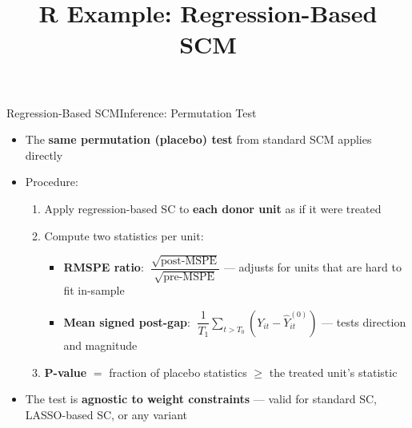 \documentclass[hyperref={pdfpagelabels=false}]{beamer}
\begin{document}
\begin{frame}{Regression-Based SCM}{Inference: Permutation Test}
\begin{itemize}
	\item The \textbf{same permutation (placebo) test} from standard SCM applies directly
	\vspace{0.2cm}
	\item Procedure:
	\begin{enumerate}
		\item Apply regression-based SC to \textbf{each donor unit} as if it were treated
		\vspace{0.1cm}
		\item Compute two statistics per unit:
		\begin{itemize}
			\item \textbf{RMSPE ratio}: $\;\dfrac{\sqrt{\text{post-MSPE}}}{\sqrt{\text{pre-MSPE}}}$ --- adjusts for units that are hard to fit in-sample
			\vspace{0.1cm}
			\item \textbf{Mean signed post-gap}: $\;\dfrac{1}{T_1}\sum_{t>T_0}(Y_{it}-\hat{Y}^{(0)}_{it})$ --- tests direction and magnitude
		\end{itemize}
		\vspace{0.1cm}
		\item \textbf{P-value} $=$ fraction of placebo statistics $\geq$ the treated unit's statistic
	\end{enumerate}
	\vspace{0.2cm}
	\item The test is \textbf{agnostic to weight constraints} --- valid for standard SC, LASSO-based SC, or any variant
\end{itemize}
\end{frame}


\title[]{R Example: Regression-Based SCM}
\author{}\institute{}\date{}
\begin{frame}{}\titlepage\end{frame}
\end{document}
